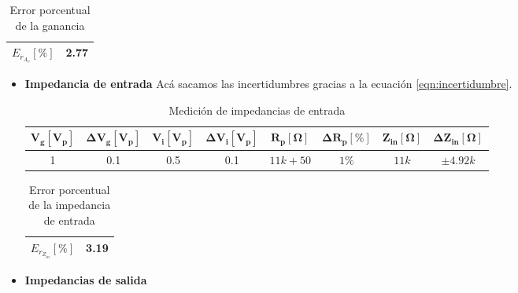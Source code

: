 \begin{enumerate}
        \begin{table}[H]
          \centering
          \begin{tabular}{|c|c|}
            \hline
            $E_{r_{A_v}} [\%]$ & 2.77 \\
            \hline
          \end{tabular}
          \caption{Error porcentual de la ganancia}
          \label{tab:error_porcentual1_av}
        \end{table}


        \begin{itemize}
          \item \textbf{Impedancia de entrada}
                Acá sacamos las incertidumbres gracias a la ecuación \ref{eqn:incertidumbre}.

                \begin{table}[H]
                  \centering
                  \begin{tabular}{|c|c|c|c|c|c|c|c|}
                    \hline
                    $\mathbf{V_g[V_p]}$ & $\mathbf{\Delta V_g[V_p]}$ & $\mathbf{V_i[V_p]}$ & $\mathbf{\Delta V_i[V_p]}$ & $\mathbf{R_p[\Omega]}$ & $\mathbf{\Delta R_p[\%]}$ & $\mathbf{Z_{in}[\Omega]}$ & $\mathbf{\Delta Z_{in}[\Omega]}$ \\
                    \hline
                    1                   & 0.1                        & 0.5                 & 0.1                        & $11 k +50$             & $1\%$                     & $11k$                     & $\pm 4.92k$                      \\
                    \hline
                  \end{tabular}
                  \caption{Medición de impedancias de entrada}
                  \label{tab:med_zin_ep}
                \end{table}

                \begin{table}[H]
                  \centering
                  \begin{tabular}{|c|c|}
                    \hline
                    $E_{r_{Z_{in}}} [\%]$ & 3.19 \\
                    \hline
                  \end{tabular}
                  \caption{Error porcentual de la impedancia de entrada}
                  \label{tab:error_porcentual1_zin}
                \end{table}

          \item \textbf{Impedancias de salida}


\end{itemize}
\end{enumerate}
